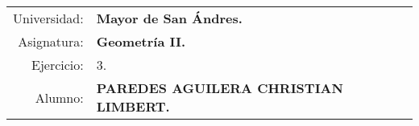 \begin{tabular}{r l }
Universidad: & \textbf{Mayor de San Ándres.}\\
Asignatura: & \textbf{Geometría II.}\\
 Ejercicio: & 3.\\ 
Alumno: & \textbf{PAREDES AGUILERA CHRISTIAN LIMBERT.}
\end{tabular}
\begin{flushleft}
\end{flushleft}
